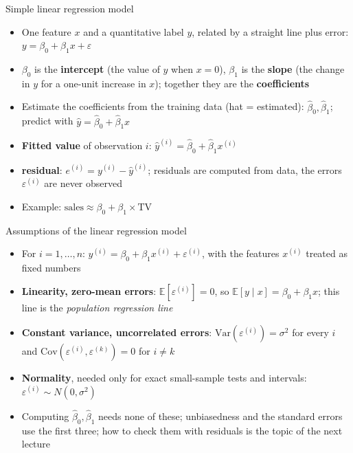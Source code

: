 \begin{frame}{Simple linear regression model}
    \begin{itemize}
        \item One feature $x$ and a quantitative label $y$, related by a straight line plus error: $y = \beta_0 + \beta_1 x + \varepsilon$
        \item $\beta_0$ is the \textbf{intercept} (the value of $y$ when $x = 0$), $\beta_1$ is the \textbf{slope} (the change in $y$ for a one-unit increase in $x$); together they are the \textbf{coefficients}
        \item Estimate the coefficients from the training data (hat = estimated): $\hat\beta_0, \hat\beta_1$; predict with $\hat{y} = \hat\beta_0 + \hat\beta_1 x$
        \item \textbf{Fitted value} of observation $i$: $\hat{y}^{(i)} = \hat\beta_0 + \hat\beta_1 x^{(i)}$
        \item \textbf{residual}: $e^{(i)} = y^{(i)} - \hat{y}^{(i)}$; residuals are computed from data, the errors $\varepsilon^{(i)}$ are never observed
        \item Example: $\text{sales} \approx \beta_0 + \beta_1 \times \text{TV}$
    \end{itemize}
\end{frame}


\begin{frame}{Assumptions of the linear regression model}
    \begin{itemize}
        \item For $i = 1, \dots, n$: $y^{(i)} = \beta_0 + \beta_1 x^{(i)} + \varepsilon^{(i)}$, with the features $x^{(i)}$ treated as fixed numbers
        \item \textbf{Linearity, zero-mean errors}: $\mathbb{E}[\varepsilon^{(i)}] = 0$, so $\mathbb{E}[y \mid x] = \beta_0 + \beta_1 x$; this line is the \emph{population regression line}
        \item \textbf{Constant variance, uncorrelated errors}: $\mathrm{Var}(\varepsilon^{(i)}) = \sigma^2$ for every $i$ and $\mathrm{Cov}(\varepsilon^{(i)}, \varepsilon^{(k)}) = 0$ for $i \neq k$
        \item \textbf{Normality}, needed only for exact small-sample tests and intervals: $\varepsilon^{(i)} \sim N(0, \sigma^2)$
        \item Computing $\hat\beta_0, \hat\beta_1$ needs none of these; unbiasedness and the standard errors use the first three; how to check them with residuals is the topic of the next lecture
    \end{itemize}
\end{frame}



